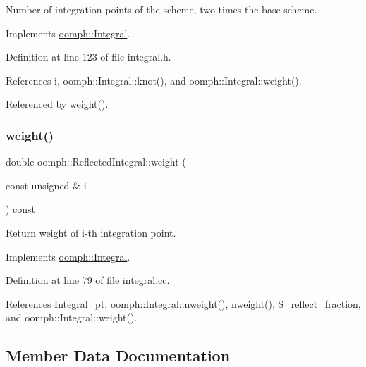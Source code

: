 Number of integration points of the scheme, two times the base scheme. 



Implements \hyperlink{classoomph_1_1Integral_a1a270de9d99a1fcf1d25a6c1017f65fa}{oomph\+::\+Integral}.



Definition at line 123 of file integral.\+h.



References i, oomph\+::\+Integral\+::knot(), and oomph\+::\+Integral\+::weight().



Referenced by weight().

\mbox{\label{classoomph_1_1ReflectedIntegral_afe7ded626ef075a55f6e99abf258e362}} 
\subsubsection{\texorpdfstring{weight()}{weight()}}
{\footnotesize\ttfamily double oomph\+::\+Reflected\+Integral\+::weight (\begin{DoxyParamCaption}\item[{const unsigned \&}]{i }\end{DoxyParamCaption}) const\hspace{0.3cm}{\ttfamily [virtual]}}



Return weight of i-\/th integration point. 



Implements \hyperlink{classoomph_1_1Integral_ac65335e2aab120b285b3d6c294507b06}{oomph\+::\+Integral}.



Definition at line 79 of file integral.\+cc.



References Integral\+\_\+pt, oomph\+::\+Integral\+::nweight(), nweight(), S\+\_\+reflect\+\_\+fraction, and oomph\+::\+Integral\+::weight().



\subsection{Member Data Documentation}
\mbox{\label{classoomph_1_1ReflectedIntegral_af0174c09605e1c073b719e65b3922257}} 
